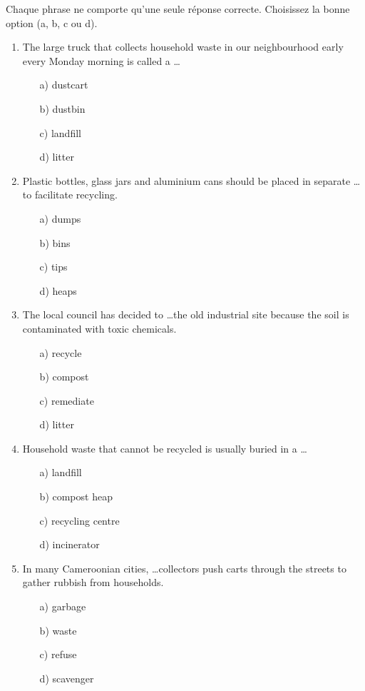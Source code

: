 \documentclass[11pt]{article}
\begin{document}
\begin{exercice}
Chaque phrase ne comporte qu'une seule réponse correcte. Choisissez la bonne option (a, b, c ou d).
\begin{enumerate}
\item The large truck that collects household waste in our neighbourhood early every Monday morning is called a \dots
\begin{itemize}
\item[a)] dustcart \item[b)] dustbin \item[c)] landfill \item[d)] litter
\end{itemize}
\item Plastic bottles, glass jars and aluminium cans should be placed in separate \dots to facilitate recycling.
\begin{itemize}
\item[a)] dumps \item[b)] bins \item[c)] tips \item[d)] heaps
\end{itemize}
\item The local council has decided to \dots the old industrial site because the soil is contaminated with toxic chemicals.
\begin{itemize}
\item[a)] recycle \item[b)] compost \item[c)] remediate \item[d)] litter
\end{itemize}
\item Household waste that cannot be recycled is usually buried in a \dots
\begin{itemize}
\item[a)] landfill \item[b)] compost heap \item[c)] recycling centre \item[d)] incinerator
\end{itemize}
\item In many Cameroonian cities, \dots collectors push carts through the streets to gather rubbish from households.
\begin{itemize}
\item[a)] garbage \item[b)] waste \item[c)] refuse \item[d)] scavenger
\end{itemize}
\end{enumerate}
\end{exercice}
\end{document}
